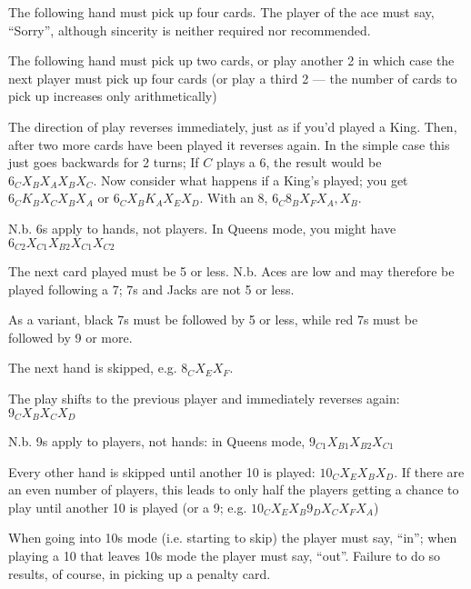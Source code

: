 \documentclass[12pt]{article}
\begin{document}
\begin{description}
\newcommand{\card}[1]{\hbox to 15mm{#1\hfil}}
\item[\card{Ace}]
  The following hand must pick up four cards.  The player of the ace must say, ``Sorry'', although sincerity is neither required nor recommended.

  \item[\card{2}]
    The following hand must pick up two cards, or play another 2 in which case the next player must
    pick up four cards (or play a third 2 --- the number of cards to pick up increases only arithmetically)

  \item[\card{6}]
    The direction of play reverses immediately, just as if you'd played a King.  Then, after two
    more cards have been played it reverses again.  In the simple case this just goes backwards
    for 2 turns; If $C$ plays
    a 6, the result would be $6_C X_B X_A X_B X_C$.  Now consider what happens if a
    King's played;  you get $6_C K_B X_C X_B X_A$ or $6_C X_B K_A X_E X_D$.  With an 8,
    $6_C 8_B X_F X_A, X_B$.

    N.b. 6s apply to hands, not players.  In Queens mode, you might have $6_{C2} X_{C1} X_{B2} X_{C1} X_{C2}$

  \item[\card{7}]
    The next card played must be 5 or less.  N.b. Aces are low and may therefore be played following a 7;
    7s and Jacks are not 5 or less.

    As a variant, black 7s must be followed by 5 or less, while red 7s must be followed by 9 or more.

  \item[\card{8}]
    The next hand is skipped, e.g. $8_C X_E X_F$.

  \item[\card{9}]
    The play shifts to the previous player and immediately reverses again: $9_C X_B X_C X_D$

    N.b. 9s apply to players, not hands: in Queens mode, $9_{C1} X_{B1} X_{B2} X_{C1}$

  \item[\card{10}]
    Every other hand is skipped until another 10 is played: $10_C X_E X_B X_D$.  If there are an even number of
    players, this leads to only half the players getting a chance to play until another
    10 is played (or a 9; e.g.  $10_C X_E X_B 9_D X_C X_F X_A$)

    When going into 10s mode (i.e. starting to skip) the player must say, ``in''; when playing a
    10 that leaves 10s mode the player must say, ``out''.  Failure to do so results, of course,
    in picking up a penalty card.


\end{description}
\end{document}
